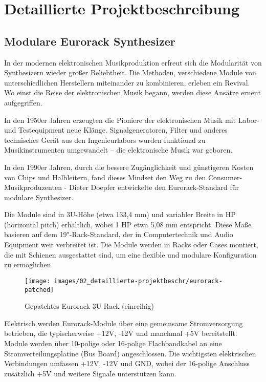 \newpage
\section{Detaillierte Projektbeschreibung}

	\subsection{Modulare Eurorack Synthesizer}
	
	In der modernen elektronischen Musikproduktion erfreut sich die Modularität von Synthesizern wieder großer Beliebtheit. 
	Die Methoden, verschiedene Module von unterschiedlichen Herstellern miteinander zu kombinieren, erleben ein Revival. \cite{ferguson2015interview}
	Wo einst die Reise der elektronischen Musik begann, werden diese Ansätze erneut aufgegriffen.
	
	In den 1950er Jahren erzeugten die Pioniere der elektronischen Musik mit Labor- und Testequipment neue Klänge. 
	Signalgeneratoren, Filter und anderes technisches Gerät aus den Ingenieurlabors wurden funktional zu Musikinstrumenten umgewandelt – die elektronische Musik war geboren. \cite{holmes2002electronic}
	
	In den 1990er Jahren, durch die bessere Zugänglichkeit und günstigeren Kosten von Chips und Halbleitern, fand dieses Mindset den Weg zu den Consumer-Musikproduzenten - Dieter Doepfer entwickelte den Eurorack-Standard für modulare Synthesizer. \cite{eurorack-standard}
	
	Die Module sind in 3U-Höhe (etwa 133,4 mm) und variabler Breite in HP (horizontal pitch) erhältlich, wobei 1 HP etwa 5,08 mm entspricht. Diese Maße basieren auf dem 19"-Rack-Standard, der in Computertechnik und Audio Equipment weit verbreitet ist. Die Module werden in Racks oder Cases montiert, die mit Schienen ausgestattet sind, um eine flexible und modulare Konfiguration zu ermöglichen. \cite{iec60297-3-108:2014}
	
	
	\begin{figure}[h!]
		\centering
		\texttt{[image: images/02\_detaillierte-projektbeschr/eurorack-patched]}
		\caption{Gepatchtes Eurorack 3U Rack (einreihig)}
		\label{fig:eurorack-patched}
	\end{figure}
	
	Elektrisch werden Eurorack-Module über eine gemeinsame Stromversorgung betrieben, die typischerweise +12V, -12V und manchmal +5V bereitstellt. Module werden über 10-polige oder 16-polige Flachbandkabel an eine Stromverteilungsplatine (Bus Board) angeschlossen. Die wichtigsten elektrischen Verbindungen umfassen +12V, -12V und GND, wobei der 16-polige Anschluss zusätzlich +5V und weitere Signale unterstützen kann. \cite{eurorack-standard}
	
